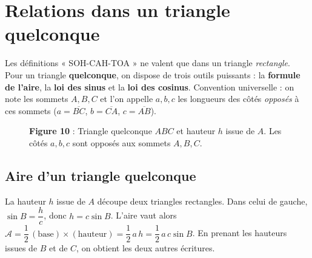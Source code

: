 \documentclass[11pt,a4paper]{article}
\begin{document}
\section{Relations dans un triangle quelconque}
Les définitions « SOH-CAH-TOA » ne valent que dans un triangle \emph{rectangle}. Pour un triangle
\textbf{quelconque}, on dispose de trois outils puissants : la \textbf{formule de l'aire}, la
\textbf{loi des sinus} et la \textbf{loi des cosinus}. Convention universelle : on note les sommets
$A,B,C$ et l'on appelle $a,b,c$ les longueurs des côtés \emph{opposés} à ces sommets
($a=\overline{BC}$, $b=\overline{CA}$, $c=\overline{AB}$).

\begin{figure}[h]
\centering
{}
\caption*{\small\textbf{\textcolor{primary}{Figure 10}} : Triangle quelconque $ABC$ et hauteur $h$
issue de $A$. Les côtés $a,b,c$ sont opposés aux sommets $A,B,C$.}
\end{figure}

\subsection{Aire d'un triangle quelconque}
La hauteur $h$ issue de $A$ découpe deux triangles rectangles. Dans celui de gauche,
$\sin B=\dfrac{h}{c}$, donc $h=c\sin B$. L'aire vaut alors
$\mathcal{A}=\dfrac12\,(\text{base})\times(\text{hauteur})=\dfrac12\,a\,h=\dfrac12\,a\,c\sin B$.
En prenant les hauteurs issues de $B$ et de $C$, on obtient les deux autres écritures.
\end{document}
